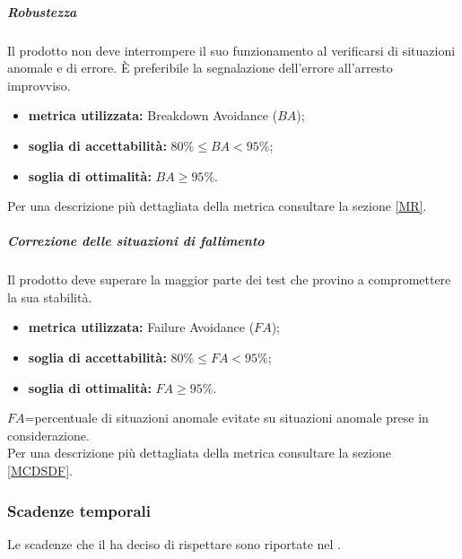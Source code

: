 \subparagraph{Robustezza}
\label{OR}
Il prodotto non deve interrompere il suo funzionamento al verificarsi di situazioni anomale e di errore. È preferibile la segnalazione dell'errore all'arresto improvviso.
\begin{itemize}
	\item \textbf{metrica utilizzata:} Breakdown Avoidance ($BA$);
	\item \textbf{soglia di accettabilità:} $80\%\leq BA<95\%$;
	\item \textbf{soglia di ottimalità:} $BA\geq95\%$.
\end{itemize}
Per una descrizione più dettagliata della metrica consultare la sezione \ref{MR}.


\subparagraph{Correzione delle situazioni di fallimento}
\label{OCDSDF}
Il prodotto deve superare la maggior parte dei test che provino a compromettere la sua stabilità.
\begin{itemize}
	\item \textbf{metrica utilizzata:} Failure Avoidance ($FA$);
	\item \textbf{soglia di accettabilità:} $80\% \leq FA<95\%$;
	\item \textbf{soglia di ottimalità:} $FA\geq95\%$.
\end{itemize}
$FA$=percentuale di situazioni anomale evitate su situazioni anomale prese in considerazione.\\
Per una descrizione più dettagliata della metrica consultare la sezione \ref{MCDSDF}.


\subsubsection{Scadenze temporali}
Le scadenze che il  ha deciso di rispettare sono riportate nel \pdpv.






